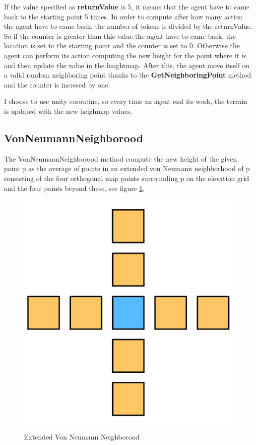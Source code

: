 \documentclass[12pt]{article}
\begin{document}
    If the value specified as \textbf{returnValue} is 5, it means that the agent have to came back to the starting point 5 times. In order to compute after how many action the agent
    have to came back, the number of tokens is divided by the returnValue. So if the counter is greater than this value the agent have to came back, the location is set to the
    starting point and the counter is set to 0. Otherwise the agent can perform its action computing the new height for the point where it is and then update the value in the haightmap.
    After this, the agent move itself on a valid random neighboring point thanks to the \textbf{GetNeighboringPoint} method and the counter is incresed by one.

    I choose to use unity coroutine, so every time an agent end its work, the terrain is updated with the new heighmap values.

    \subsection{VonNeumannNeighborood} \label{section:Von Neumann}
    The VonNeumannNeighborood method compute the new height of the given point p as the average of points in an extended von Neumann neighborhood of p consisting of the
    four orthogonal map points surrounding p on the elevation grid and the four points beyond these, see figure \ref{fig:vonNeumann}.

    \begin{figure}
        \centering
        \includegraphics[scale = 0.7]{images/Extended VonNeumannNeighborhood.png}
        \caption{Extended Von Neumann Neighborood}
        \label{fig:vonNeumann}
    \end{figure}
\end{document}
